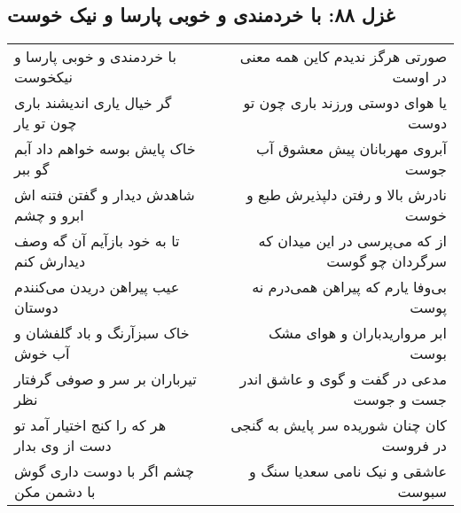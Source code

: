 \begin{center}
\section*{غزل ۸۸: با خردمندی و خوبی پارسا و نیک خوست}
\label{sec:088}
\begin{longtable}{l p{0.5cm} r}
با خردمندی و خوبی پارسا و نیکخوست
&&
صورتی هرگز ندیدم کاین همه معنی در اوست
\\
گر خیال یاری اندیشند باری چون تو یار
&&
یا هوای دوستی ورزند باری چون تو دوست
\\
خاک پایش بوسه خواهم داد آبم گو ببر
&&
آبروی مهربانان پیش معشوق آب جوست
\\
شاهدش دیدار و گفتن فتنه اش ابرو و چشم
&&
نادرش بالا و رفتن دلپذیرش طبع و خوست
\\
تا به خود بازآیم آن گه وصف دیدارش کنم
&&
از که می‌پرسی در این میدان که سرگردان چو گوست
\\
عیب پیراهن دریدن می‌کنندم دوستان
&&
بی‌وفا یارم که پیراهن همی‌درم نه پوست
\\
خاک سبزآرنگ و باد گلفشان و آب خوش
&&
ابر مرواریدباران و هوای مشک بوست
\\
تیرباران بر سر و صوفی گرفتار نظر
&&
مدعی در گفت و گوی و عاشق اندر جست و جوست
\\
هر که را کنج اختیار آمد تو دست از وی بدار
&&
کان چنان شوریده سر پایش به گنجی در فروست
\\
چشم اگر با دوست داری گوش با دشمن مکن
&&
عاشقی و نیک نامی سعدیا سنگ و سبوست
\\
\end{longtable}
\end{center}
